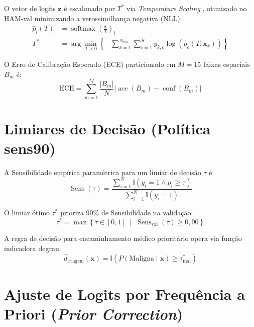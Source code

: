 \documentclass[oneside,english,brazilian]{UNISINOSmonografia}
\begin{document}
O vetor de logits $\mathbf{z}$ é escalonado por $T^*$ via \textit{Temperature Scaling} \cite{guo2017calibration}, otimizado no HAM-val minimizando a verossimilhança negativa (NLL):
\begin{align}
    \hat{p}_i(T) &= \operatorname{softmax}\left(\frac{\mathbf{z}}{T}\right)_i \label{eq:apendice_temp_scaling} \\
    T^* &= \arg\min_{T > 0} \left\{ -\sum_{k=1}^{N_{\text{val}}} \sum_{c=1}^K y_{k,c} \log\left(\hat{p}_c(T; \mathbf{x}_k)\right) \right\} \label{eq:apendice_otimizacao_temperatura}
\end{align}

O Erro de Calibração Esperado (ECE) particionado em $M=15$ faixas espaciais $B_m$ é:
\begin{equation}
    \label{eq:apendice_ece}
    \text{ECE} = \sum_{m=1}^{M} \frac{|B_m|}{N} \left| \operatorname{acc}(B_m) - \operatorname{conf}(B_m) \right|
\end{equation}

\section{Limiares de Decisão (Política sens90)}
\label{sec:apendice_limiares}

A Sensibilidade empírica paramétrica para um limiar de decisão $\tau$ é:
\begin{equation}
    \label{eq:apendice_sensibilidade}
    \operatorname{Sens}(\tau) = \frac{\sum_{i=1}^N \mathbb{I}(y_i = 1 \land p_i \ge \tau)}{\sum_{i=1}^N \mathbb{I}(y_i = 1)}
\end{equation}

O limiar ótimo $\tau^*$ prioriza 90\% de Sensibilidade na validação:
\begin{equation}
    \label{eq:apendice_limiar_sens90}
    \tau^* = \max \left\{ \tau \in [0, 1] \;\middle|\; \operatorname{Sens}_{\text{val}}(\tau) \ge 0{,}90 \right\}
\end{equation}

A regra de decisão para encaminhamento médico prioritário opera via função indicadora degrau:
\begin{equation}
    \label{eq:apendice_regra_decisao}
    \hat{d}_{\text{triagem}}(\mathbf{x}) = \mathbb{I} \left( P(\text{Maligna} \mid \mathbf{x}) \ge \tau_{\text{mal}}^* \right)
\end{equation}

\section{Ajuste de Logits por Frequência a Priori (\textit{Prior Correction})}
\label{sec:apendice_prior_correction}
\end{document}
